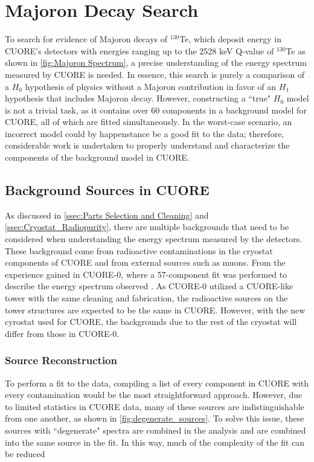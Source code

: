 \chapter{Majoron Decay Search}
To search for evidence of Majoron decays of $^{130}$Te, which deposit energy in CUORE's detectors with energies ranging up to the 2528 keV Q-value of $^{130}$Te as shown in \autoref{fig:Majoron Spectrum}, a precise understanding of the energy spectrum measured by CUORE is needed.
In essence, this search is purely a comparison of a $H_0$ hypothesis of physics without a Majoron contribution in favor of an $H_1$ hypothesis that includes Majoron decay.
However, constructing a ``true" $H_0$ model is not a trivial task, as it contains over 60 components in a background model for CUORE, all of which are fitted simultaneously.
In the worst-case scenario, an incorrect model could by happenstance be a good fit to the data; therefore, considerable work is undertaken to properly understand and characterize the components of the background model in CUORE.

\section{Background Sources in CUORE}
As discussed in \autoref{ssec:Parts Selection and Cleaning} and \autoref{ssec:Cryostat_Radiopurity}, there are multiple backgrounds that need to be considered when understanding the energy spectrum measured by the detectors.
These background come from radioactive contaminations in the cryostat components of CUORE and from external sources such as muons.
From the experience gained in CUORE-0, where a 57-component fit was performed to describe the energy spectrum observed \cite{Alduino:2016vtd}.
As CUORE-0 utilized a CUORE-like tower with the same cleaning and fabrication, the radioactive sources on the tower structures are expected to be the same in CUORE.
However, with the new cyrostat used for CUORE, the backgrounds due to the rest of the cryostat will differ from those in CUORE-0.

\subsection*{Source Reconstruction}
To perform a fit to the data, compiling a list of every component in CUORE with every contamination would be the most straightforward approach.
However, due to limited statistics in CUORE data, many of these sources are indistinguishable from one another, as shown in \autoref{fig:degenerate_sources}.
To solve this issue, these sources with ``degenerate" spectra are combined in the analysis and are combined into the same source in the fit.
In this way, much of the complexity of the fit can be reduced


